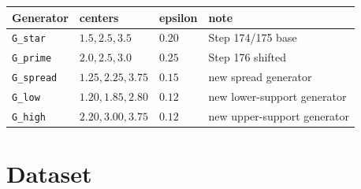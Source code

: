 \documentclass[11pt]{article}
\begin{document}
\begin{center}
\begin{tabular}{llll}
\toprule
Generator & centers & epsilon & note\\
\midrule
\texttt{G\_star} & \(1.5,2.5,3.5\) & \(0.20\) & Step 174/175 base\\
\texttt{G\_prime} & \(2.0,2.5,3.0\) & \(0.25\) & Step 176 shifted\\
\texttt{G\_spread} & \(1.25,2.25,3.75\) & \(0.15\) & new spread generator\\
\texttt{G\_low} & \(1.20,1.85,2.80\) & \(0.12\) & new lower-support generator\\
\texttt{G\_high} & \(2.20,3.00,3.75\) & \(0.12\) & new upper-support generator\\
\bottomrule
\end{tabular}
\end{center}

\section*{Dataset}
\end{document}

